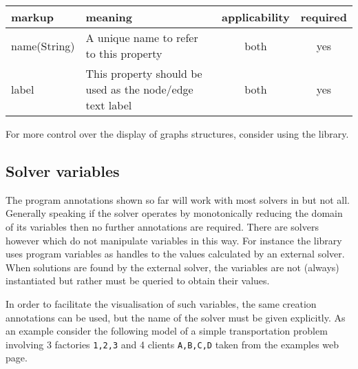 \begin{tabular}{|l|p{}|c|c|}
\hline
markup & meaning & applicability & required \\
\hline
\hline
name(String) & A unique name to refer to this property & both & yes \\
\hline
label & This property should be used as the node/edge text label & both & yes \\
\hline
\end{tabular}
For more control over the display of graphs structures, consider using
the  library.

\subsection{Solver variables}
The program annotations shown so far will work with most solvers in
{\eclipse} but not all.  Generally speaking if the solver operates by
monotonically reducing the domain of its variables then no further
annotations are required.  There are solvers however which do not
manipulate variables in this way.  For instance the
 library uses
{\eclipse} program variables as handles to the values calculated by an
external solver.  When solutions are found by the external solver, the
{\eclipse} variables are not (always) instantiated but rather must be
queried to obtain their values.

In order to facilitate the visualisation of such variables, the same
\viewable creation annotations can be used, but the name of the solver
must be given explicitly.  As an example consider the following
 model of a simple
transportation problem involving 3 factories \texttt{1,2,3} and 4
clients \texttt{A,B,C,D} taken from the {\eclipse} examples web page.

